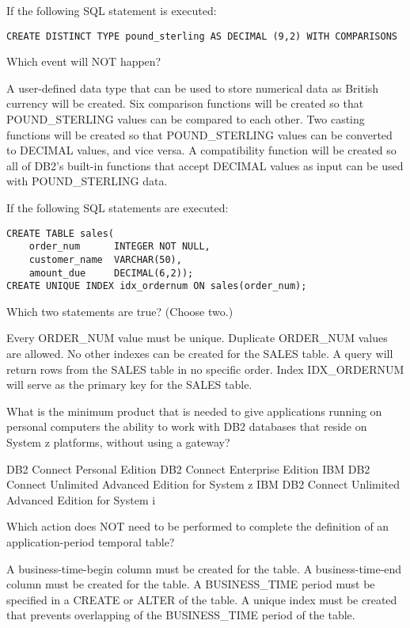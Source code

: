 \documentclass[11pt]{exam}
\begin{document}
\begin{questions}
\question[1]
If the following SQL statement is executed: 
\begin{verbatim}
CREATE DISTINCT TYPE pound_sterling AS DECIMAL (9,2) WITH COMPARISONS
\end{verbatim}
Which event will NOT happen?
\begin{choices}
\choice A user-defined data type that can be used to store numerical data as British currency will be
created.
\choice Six comparison functions will be created so that POUND\_STERLING values can be compared to each
other.
\choice Two casting functions will be created so that POUND\_STERLING values can be converted to DECIMAL
values, and vice versa.
\choice A compatibility function will be created so all of DB2's built-in functions that accept DECIMAL
values as input can be used with POUND\_STERLING data.
\end{choices}

\question[1]
If the following SQL statements are executed:
\begin{verbatim}
CREATE TABLE sales(
	order_num      INTEGER NOT NULL,
	customer_name  VARCHAR(50),
	amount_due     DECIMAL(6,2));
CREATE UNIQUE INDEX idx_ordernum ON sales(order_num);
\end{verbatim}
Which two statements are true? (Choose two.)
\begin{choices}
\choice Every ORDER\_NUM value must be unique.
\choice Duplicate ORDER\_NUM values are allowed.
\choice No other indexes can be created for the SALES table.
\choice A query will return rows from the SALES table in no specific order.
\choice Index IDX\_ORDERNUM will serve as the primary key for the SALES table.
\end{choices}

\question[1]
What is the minimum product that is needed to give applications running on personal computers the 
ability to work with DB2 databases that reside on System z platforms, without using a gateway?
\begin{choices}
\choice DB2 Connect Personal Edition
\choice DB2 Connect Enterprise Edition
\choice IBM DB2 Connect Unlimited Advanced Edition for System z
\choice IBM DB2 Connect Unlimited Advanced Edition for System i
\end{choices}

\newpage
\question[1]
Which action does NOT need to be performed to complete the definition of an application-period temporal
table?
\begin{choices}
\choice A business-time-begin column must be created for the table.
\choice A business-time-end column must be created for the table.
\choice A BUSINESS\_TIME period must be specified in a CREATE or ALTER of the table.
\choice A unique index must be created that prevents overlapping of the BUSINESS\_TIME period of the 
table.
\end{choices}


\end{questions}
\end{document}
